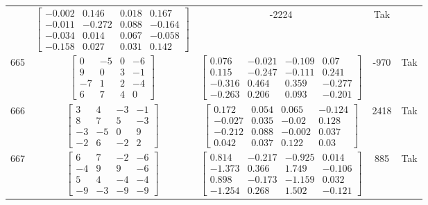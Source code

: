 \documentclass[a4paper,12pt]{article}
\begin{document}
\begin{tabular}{c c c c c}
&
$\begin{bmatrix} -0.002 & 0.146 & 0.018 & 0.167 \\ -0.011 & -0.272 & 0.088 & -0.164 \\ -0.034 & 0.014 & 0.067 & -0.058 \\ -0.158 & 0.027 & 0.031 & 0.142 \end{bmatrix}$
&
-2224
&
Tak
\\
665
&
$\begin{bmatrix} 0 & -5 & 0 & -6 \\ 9 & 0 & 3 & -1 \\ -7 & 1 & 2 & -4 \\ 6 & 7 & 4 & 0 \end{bmatrix}$
&
$\begin{bmatrix} 0.076 & -0.021 & -0.109 & 0.07 \\ 0.115 & -0.247 & -0.111 & 0.241 \\ -0.316 & 0.464 & 0.359 & -0.277 \\ -0.263 & 0.206 & 0.093 & -0.201 \end{bmatrix}$
&
-970
&
Tak
\\
666
&
$\begin{bmatrix} 3 & 4 & -3 & -1 \\ 8 & 7 & 5 & -3 \\ -3 & -5 & 0 & 9 \\ -2 & 6 & -2 & 2 \end{bmatrix}$
&
$\begin{bmatrix} 0.172 & 0.054 & 0.065 & -0.124 \\ -0.027 & 0.035 & -0.02 & 0.128 \\ -0.212 & 0.088 & -0.002 & 0.037 \\ 0.042 & 0.037 & 0.122 & 0.03 \end{bmatrix}$
&
2418
&
Tak
\\
667
&
$\begin{bmatrix} 6 & 7 & -2 & -6 \\ -4 & 9 & 9 & -6 \\ 5 & 4 & -4 & -4 \\ -9 & -3 & -9 & -9 \end{bmatrix}$
&
$\begin{bmatrix} 0.814 & -0.217 & -0.925 & 0.014 \\ -1.373 & 0.366 & 1.749 & -0.106 \\ 0.898 & -0.173 & -1.159 & 0.032 \\ -1.254 & 0.268 & 1.502 & -0.121 \end{bmatrix}$
&
885
&
Tak
\\

\end{tabular}
\end{document}
